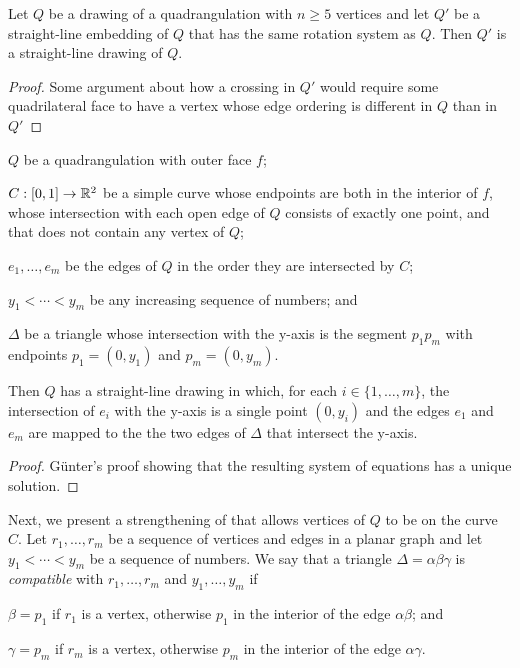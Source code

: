 \documentclass{patmorin}
\begin{document}
\begin{lem}
   Let $Q$ be a drawing of a quadrangulation with $n\ge 5$ vertices
   and let $Q'$ be a straight-line embedding of $Q$ that has the same
   rotation system as $Q$.  Then $Q'$ is a straight-line drawing of $Q$.
\end{lem}

\begin{proof}
   Some argument about how a crossing in $Q'$ would require some
   quadrilateral face to have a vertex whose edge ordering is different
   in $Q$ than in $Q'$
\end{proof}

\begin{lem}
    \begin{compactitem}
    \item $Q$ be a quadrangulation with outer face $f$; 
    \item $C:[0,1]\to\mathbb{R}^2$ be a simple curve
     whose endpoints are both in the interior of $f$, 
     whose intersection with each open edge of $Q$
     consists of exactly one point, and that does not contain
     any vertex of $Q$; 
    \item $e_1,\ldots,e_m$ be the edges of $Q$ in the
    order they are intersected by $C$; 
    \item $y_1<\cdots<y_m$
    be any increasing sequence of numbers; and
    \item $\Delta$ be a triangle whose intersection with the y-axis
     is the segment $p_1p_m$ with endpoints $p_1=(0,y_1)$ and $p_m=(0,y_m)$.
    \end{compactitem}
    Then $Q$ has a straight-line
    drawing in which, for each $i\in\{1,\ldots,m\}$, the intersection
    of $e_i$ with the y-axis is a single point $(0,y_i)$ and the edges
    $e_1$ and $e_m$ are mapped to the the two edges of $\Delta$ that
    intersect the y-axis.
\end{lem}

\begin{proof}
   G\"unter's proof showing that the resulting system of equations has a unique solution.
\end{proof}

Next, we present a strengthening of  that allows vertices
of $Q$ to be on the curve $C$.  Let $r_1,\ldots,r_m$ be a sequence
of vertices and edges in a planar graph and let $y_1<\cdots<y_m$ be a
sequence of numbers.  We say that a triangle $\Delta=\alpha\beta\gamma$
is \emph{compatible} with $r_1,\ldots,r_m$ and $y_1,\ldots,y_m$ if
\begin{compactenum}
  \item $\beta=p_1$ if $r_1$ is a vertex, otherwise $p_1$ in the interior
  of the edge $\alpha\beta$; and
  \item $\gamma=p_m$ if $r_m$ is a vertex, otherwise $p_m$ in the interior
  of the edge $\alpha\gamma$.
\end{compactenum}
\end{document}
